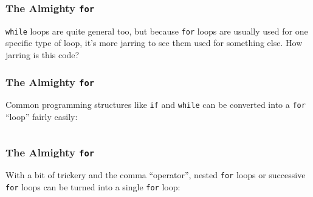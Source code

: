 \documentclass[handout,xcolor]{beamer}
\begin{document}
\begin{frame}
	\frametitle{The Almighty \texttt{for}}
	\pause
	
	\texttt{while} loops are quite general too, but because \texttt{for} loops are usually used for one specific type of loop, it's more jarring to see them used for something else. \pause How jarring is this code?
	
	
\end{frame}

\begin{frame}
	\frametitle{The Almighty \texttt{for}}
	\pause
	
	Common programming structures like \texttt{if} and \texttt{while} can be converted into a \texttt{for} ``loop'' fairly easily:
	\pause
	
	\begin{columns}
		\begin{column}{0.45\textwidth}
			\centering
			
			\pause
			
		\end{column}
		\pause
		\begin{column}{0.45\textwidth}
			\centering
			
			\pause
			
		\end{column}
	\end{columns}
\end{frame}

\begin{frame}
	\frametitle{The Almighty \texttt{for}}
	\pause
	
	With a bit of trickery and the comma ``operator'', nested \texttt{for} loops or successive \texttt{for} loops can be turned into a single \texttt{for} loop:
	\pause
	
	\begin{columns}
		\begin{column}{0.45\textwidth}
			\centering
			
			\pause
			
		\end{column}
		\pause
		\begin{column}{0.45\textwidth}
			\centering
			
			\pause
			
		\end{column}
	\end{columns}
\end{frame}
\end{document}
